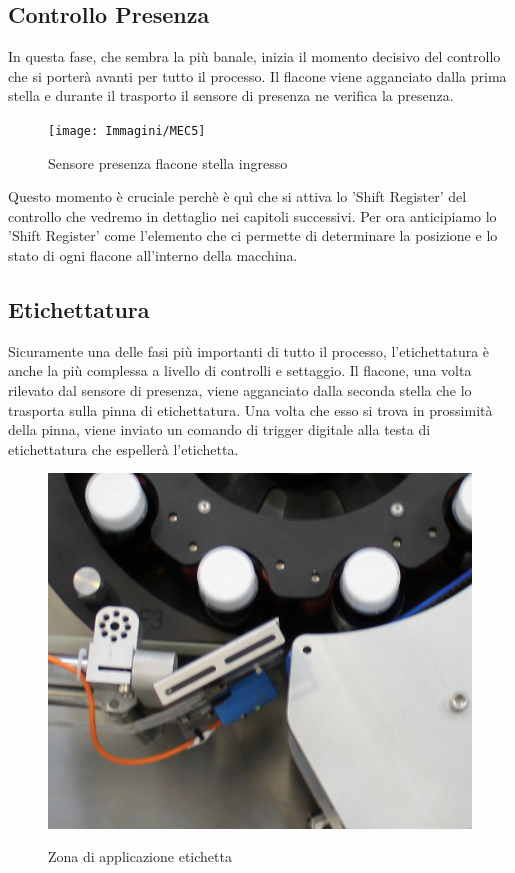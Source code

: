 \documentclass[12pt, a4paper, oneside]{book}
\begin{document}
\subsection{Controllo Presenza}
In questa fase, che sembra la più banale, inizia il momento decisivo del controllo che si porterà avanti per tutto il processo. Il flacone viene agganciato dalla prima stella e durante il trasporto il sensore di presenza ne verifica la presenza. 

	\begin{figure}[H]
	\centering
	\texttt{[image: Immagini/MEC5]}
	\label{mec5}
	\caption{ Sensore presenza flacone stella ingresso}
	\end{figure}

Questo momento è cruciale perchè è quì che si attiva lo 'Shift Register' del controllo che vedremo in dettaglio nei capitoli successivi. Per ora anticipiamo lo 'Shift Register' come l'elemento che ci permette di determinare la posizione e lo stato di ogni flacone all'interno della macchina.


\subsection{Etichettatura}
Sicuramente una delle fasi più importanti di tutto il processo, l'etichettatura è anche la più complessa a livello di controlli e settaggio. Il flacone, una volta rilevato dal sensore di presenza, viene agganciato dalla seconda stella che lo trasporta sulla pinna di etichettatura. Una volta che esso si trova in prossimità della pinna, viene inviato un comando di trigger digitale alla testa di etichettatura che espellerà l'etichetta. 

\begin{figure}[H]
	\centering
	\includegraphics[width=12cm]{Immagini/MEC6}
	\label{mec6}
	\caption{ Zona di applicazione etichetta }
\end{figure}
\end{document}
